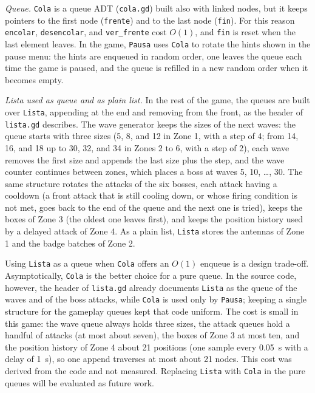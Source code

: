 \documentclass[conference]{IEEEtran}
\begin{document}
\textit{Queue.} \texttt{Cola} is a queue ADT (\texttt{cola.gd}) built also with linked nodes, but it keeps pointers to the first node (\texttt{frente}) and to the last node (\texttt{fin}). For this reason \texttt{encolar}, \texttt{desencolar}, and \texttt{ver\_frente} cost $O(1)$, and \texttt{fin} is reset when the last element leaves. In the game, \texttt{Pausa} uses \texttt{Cola} to rotate the hints shown in the pause menu: the hints are enqueued in random order, one leaves the queue each time the game is paused, and the queue is refilled in a new random order when it becomes empty.

\textit{Lista used as queue and as plain list.} In the rest of the game, the queues are built over \texttt{Lista}, appending at the end and removing from the front, as the header of \texttt{lista.gd} describes. The wave generator keeps the sizes of the next waves: the queue starts with three sizes (5, 8, and 12 in Zone 1, with a step of 4; from 14, 16, and 18 up to 30, 32, and 34 in Zones 2 to 6, with a step of 2), each wave removes the first size and appends the last size plus the step, and the wave counter continues between zones, which places a boss at waves 5, 10, \dots, 30. The same structure rotates the attacks of the six bosses, each attack having a cooldown (a front attack that is still cooling down, or whose firing condition is not met, goes back to the end of the queue and the next one is tried), keeps the boxes of Zone 3 (the oldest one leaves first), and keeps the position history used by a delayed attack of Zone 4. As a plain list, \texttt{Lista} stores the antennas of Zone 1 and the badge batches of Zone 2.

Using \texttt{Lista} as a queue when \texttt{Cola} offers an $O(1)$ enqueue is a design trade-off. Asymptotically, \texttt{Cola} is the better choice for a pure queue. In the source code, however, the header of \texttt{lista.gd} already documents \texttt{Lista} as the queue of the waves and of the boss attacks, while \texttt{Cola} is used only by \texttt{Pausa}; keeping a single structure for the gameplay queues kept that code uniform. The cost is small in this game: the wave queue always holds three sizes, the attack queues hold a handful of attacks (at most about seven), the boxes of Zone 3 at most ten, and the position history of Zone 4 about 21 positions (one sample every 0.05~s with a delay of 1~s), so one append traverses at most about 21 nodes. This cost was derived from the code and not measured. Replacing \texttt{Lista} with \texttt{Cola} in the pure queues will be evaluated as future work.
\end{document}
